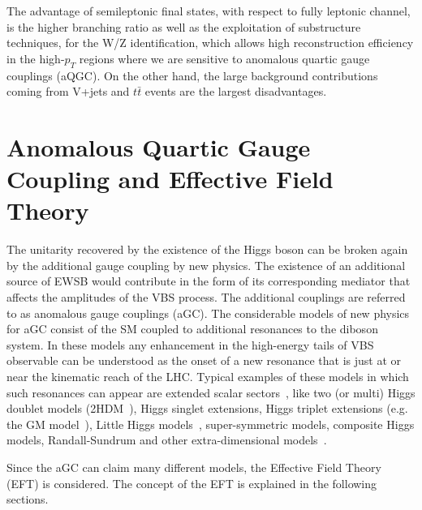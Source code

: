 The advantage of semileptonic final states, with respect to fully leptonic channel, is the higher branching ratio as well as the exploitation of 
substructure techniques, for the W/Z identification, which allows high reconstruction efficiency in the high-$p_T$ regions where we are sensitive to anomalous quartic gauge couplings (aQGC). On the other hand, the large background contributions coming from V+jets and $t\bar{t}$ events are the largest disadvantages. 

\section{Anomalous Quartic Gauge Coupling and Effective Field Theory}
The unitarity recovered by the existence of the Higgs boson can be broken again by the additional gauge coupling by new physics. 
The existence of an additional source of EWSB would contribute in the form of its corresponding mediator that affects the amplitudes of the VBS process. 
The additional couplings are referred to as anomalous gauge couplings (aGC). 
The considerable models of new physics for aGC consist of the SM coupled to additional resonances to the diboson system.
In these models any enhancement in the high-energy tails of VBS observable can be understood as the onset of a new resonance that is just at or near the kinematic reach of the LHC.
Typical examples of these models in which such resonances can appear are extended scalar sectors~\cite{https://doi.org/10.48550/arxiv.2005.09889}, like two (or multi) Higgs doublet models (2HDM~\cite{BRANCO20121}), Higgs singlet extensions, Higgs triplet extensions (e.g. the GM model~\cite{PhysRevD.90.015007}), Little Higgs models~\cite{PhysRevD.71.015008}, super-symmetric models, composite Higgs models, Randall-Sundrum and other extra-dimensional models~\cite{cite-key}.

Since the aGC can claim many different models, the Effective Field Theory (EFT) is considered. 
The concept of the EFT is explained in the following sections.
